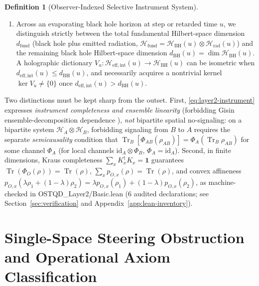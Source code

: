 \documentclass[11pt,a4paper]{article}
\theoremstyle{definition}
\newtheorem{definition}{Definition}
\theoremstyle{remark}
\newcommand{\Tr}{\operatorname{Tr}}
\newcommand{\id}{\mathrm{id}}
\newcommand{\cH}{\mathcal{H}}
\newcommand{\cI}{\mathcal{I}}
\newcommand{\1}{\mathbf{1}}
\newcommand{\code}[1]{{\scriptsize\ttfamily #1}}
\begin{document}
\begin{definition}[Observer-Indexed Selective Instrument System]
\begin{enumerate}
  \begin{equation}\label{eq:born-weights}
    p_{O,c,x}(\rho_O) := \tau_O\bigl(\cI_{O,c,x}(\rho_O)\bigr) = \tau_O(\rho_O E_{O,c,x}),
    \qquad
    \rho_{O|c,x} := p_{O,c,x}^{-1}\,\cI_{O,c,x}(\rho_O) \quad (p_{O,c,x}>0).
  \end{equation}
  \item Across an evaporating black hole horizon at step or retarded time $u$, we distinguish strictly between the total fundamental Hilbert-space dimension $d_{\mathrm{fund}}$ (black hole plus emitted radiation, $\cH_{\mathrm{fund}}=\cH_{\mathrm{BH}}(u)\otimes\cH_{\mathrm{rad}}(u)$) and the remaining black hole Hilbert-space dimension $d_{\mathrm{BH}}(u)=\dim\cH_{\mathrm{BH}}(u)$. A holographic dictionary $V_u:\cH_{\mathrm{eff,int}}(u)\to\cH_{\mathrm{BH}}(u)$ \cite{Akers2024} can be isometric when $d_{\mathrm{eff,int}}(u)\le d_{\mathrm{BH}}(u)$, and necessarily acquires a nontrivial kernel $\ker V_u\neq\{0\}$ once $d_{\mathrm{eff,int}}(u)>d_{\mathrm{BH}}(u)$.
\end{enumerate}
\end{definition}

Two distinctions must be kept sharp from the outset. First, \eqref{eq:layer2-instrument} expresses \emph{instrument completeness and ensemble linearity} (forbidding Gisin ensemble-decomposition dependence \cite{Gisin1990}), \emph{not} bipartite spatial no-signaling: on a bipartite system $\cH_A\otimes\cH_B$, forbidding signaling from $B$ to $A$ requires the separate \emph{semicausality} condition \cite{Beckman2001} that $\Tr_B[\Phi_{AB}(\rho_{AB})]=\Phi_A(\Tr_B\rho_{AB})$ for some channel $\Phi_A$ (for local channels $\id_A\otimes\Phi_B$, $\Phi_A=\id_A$). Second, in finite dimensions, Kraus completeness $\sum_x K_x^\dagger K_x=\1$ guarantees $\Tr(\Phi_O(\rho))=\Tr(\rho)$, $\sum_x p_{O,x}(\rho)=\Tr(\rho)$, and convex affineness $p_{O,x}(\lambda\rho_1+(1-\lambda)\rho_2)=\lambda p_{O,x}(\rho_1)+(1-\lambda)p_{O,x}(\rho_2)$, as machine-checked in \code{OSTQD\_Layer2/\allowbreak Basic.lean} (6 audited declarations; see Section~\ref{sec:verification} and Appendix~\ref{app:lean-inventory}).

\section{Single-Space Steering Obstruction and Operational Axiom Classification}\label{sec:steering}
\end{document}
